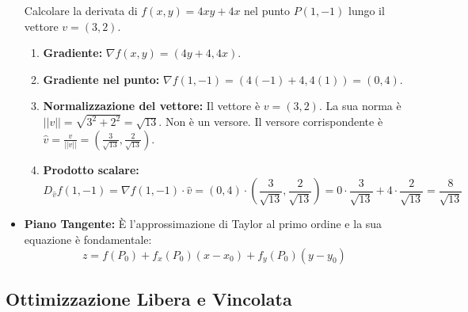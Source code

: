 \documentclass[a4paper, 12pt]{article}
\begin{document}
\begin{itemize}
    \begin{esempio}
    Calcolare la derivata di $f(x,y) = 4xy+4x$ nel punto $P(1,-1)$ lungo il vettore $v=(3,2)$. 
    \begin{enumerate}
        \item \textbf{Gradiente:} $\nabla f(x,y) = (4y+4, 4x)$.
        \item \textbf{Gradiente nel punto:} $\nabla f(1,-1) = (4(-1)+4, 4(1)) = (0,4)$.
        \item \textbf{Normalizzazione del vettore:} Il vettore è $v=(3,2)$. La sua norma è $||v|| = \sqrt{3^2+2^2} = \sqrt{13}$. Non è un versore.
        Il versore corrispondente è $\hat{v} = \frac{v}{||v||} = \left(\frac{3}{\sqrt{13}}, \frac{2}{\sqrt{13}}\right)$.
        \item \textbf{Prodotto scalare:}
        \[ D_{\hat{v}}f(1,-1) = \nabla f(1,-1) \cdot \hat{v} = (0,4) \cdot \left(\frac{3}{\sqrt{13}}, \frac{2}{\sqrt{13}}\right) = 0 \cdot \frac{3}{\sqrt{13}} + 4 \cdot \frac{2}{\sqrt{13}} = \frac{8}{\sqrt{13}} \]
    \end{enumerate}
    \end{esempio}

    \item \textbf{Piano Tangente:} È l'approssimazione di Taylor al primo ordine e la sua equazione è fondamentale: 
    \[ z = f(P_0) + f_x(P_0)(x - x_0) + f_y(P_0)(y - y_0) \]
\end{itemize}

\subsection{Ottimizzazione Libera e Vincolata}
\end{document}

